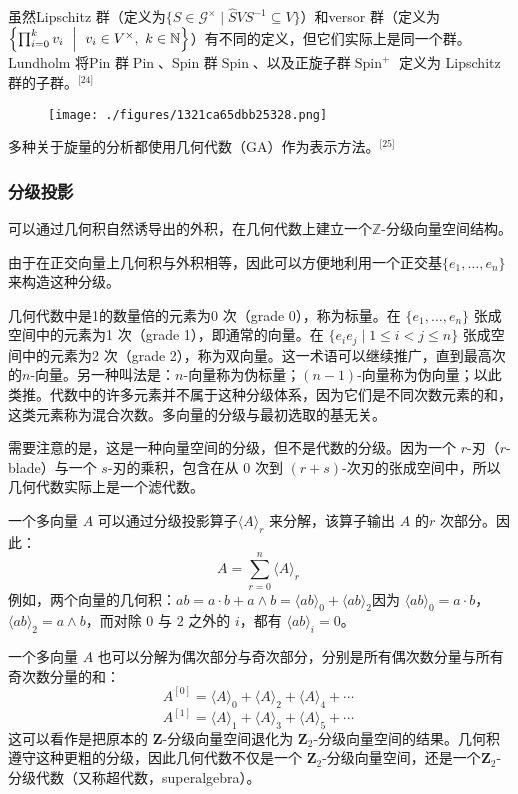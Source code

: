 虽然Lipschitz 群（定义为$\{S \in \mathcal{G}^{\times} \mid \widehat{S} V S^{-1} \subseteq V\}$）和versor 群（定义为$\Bigl\{\prod_{i=0}^{k} v_i \ \Bigm| \ v_i \in V^{\times}, \ k \in \mathbb{N}\Bigr\}$）有不同的定义，但它们实际上是同一个群。Lundholm 将Pin 群$\operatorname{Pin}$、Spin 群$\operatorname{Spin}$、以及正旋子群$\operatorname{Spin}^{+}$ 定义为 Lipschitz 群的子群。\(^\text{[24]}\)
\begin{figure}[ht]
\centering
\texttt{[image: ./figures/1321ca65dbb25328.png]}
\caption{} \label{fig_jiheds_3}
\end{figure}
多种关于旋量的分析都使用几何代数（GA）作为表示方法。\(^\text{[25]}\)
\subsubsection{分级投影}
可以通过几何积自然诱导出的外积，在几何代数上建立一个$\mathbb{Z}$-分级向量空间结构。

由于在正交向量上几何积与外积相等，因此可以方便地利用一个正交基$\{e_{1}, \ldots , e_{n}\}$来构造这种分级。

几何代数中是1的数量倍的元素为0 次（grade 0），称为标量。在 $\{e_{1}, \ldots , e_{n}\}$ 张成空间中的元素为1 次（grade 1），即通常的向量。在 $\{e_{i}e_{j}\mid 1\leq i<j\leq n\}$ 张成空间中的元素为2 次（grade 2），称为双向量。这一术语可以继续推广，直到最高次的$n$-向量。另一种叫法是：$n$-向量称为伪标量；$(n-1)$-向量称为伪向量；以此类推。代数中的许多元素并不属于这种分级体系，因为它们是不同次数元素的和，这类元素称为混合次数。多向量的分级与最初选取的基无关。

需要注意的是，这是一种向量空间的分级，但不是代数的分级。因为一个 $r$-刃（$r$-blade）与一个 $s$-刃的乘积，包含在从 0 次到 $(r+s)$-次刃的张成空间中，所以几何代数实际上是一个滤代数。

一个多向量 $A$ 可以通过分级投影算子$\langle A\rangle_r$ 来分解，该算子输出 $A$ 的$r$ 次部分。因此：
$$
A = \sum_{r=0}^{n} \langle A \rangle_{r}~
$$
例如，两个向量的几何积：$ab = a \cdot b + a \wedge b = \langle ab \rangle_{0} + \langle ab \rangle_{2}$因为 $\langle ab \rangle_{0} = a \cdot b$，$\langle ab \rangle_{2} = a \wedge b$，而对除 $0$ 与 $2$ 之外的 $i$，都有 $\langle ab \rangle_{i} = 0$。

一个多向量 $A$ 也可以分解为偶次部分与奇次部分，分别是所有偶次数分量与所有奇次数分量的和：
$$
A^{[0]} = \langle A \rangle_{0} + \langle A \rangle_{2} + \langle A \rangle_{4} + \cdots~
$$
$$
A^{[1]} = \langle A \rangle_{1} + \langle A \rangle_{3} + \langle A \rangle_{5} + \cdots~
$$
这可以看作是把原本的 $\mathbf{Z}$-分级向量空间退化为 $\mathbf{Z}_2$-分级向量空间的结果。几何积遵守这种更粗的分级，因此几何代数不仅是一个 $\mathbf{Z}_2$-分级向量空间，还是一个$\mathbf{Z}_2$-分级代数（又称超代数，superalgebra）。

